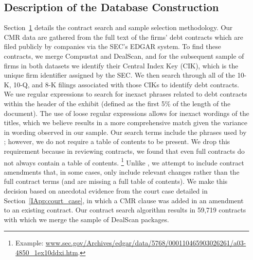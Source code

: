 \documentclass[12pt]{article}
\begin{document}
\begin{appendices}
%
%
\clearpage
\setcounter{page}{1}
\doublespacing

\section{Description of the Database Construction}
\label{IApp:mainvar}

Section~\ref{IApp:mainvar} details the contract search and sample selection methodology.
Our CMR data are gathered from the full text of the firms' debt contracts which are filed publicly by companies via the SEC's EDGAR system.
To find these contracts, we merge Compustat and DealScan, and for the subsequent sample of firms in both datasets we identify their Central Index Key (CIK), which is the unique firm identifier assigned by the SEC.
We then search through all of the 10-K, 10-Q, and 8-K filings associated with those CIKs to identify debt contracts.
We use regular expressions to search for inexact phrases related to debt contracts within the header of the exhibit (defined as the first 5\% of the length of the document).
The use of loose regular expressions allows for inexact wordings of the titles, which we believe results in a more comprehensive match given the variance in wording observed in our sample.
Our search terms include the phrases used by \cite{Nini_2009}; however, we do not require a table of contents to be present. We drop this requirement because in reviewing contracts, we found that even full contracts do not always contain a table of contents.%
    \footnote{Example: \href{http://www.sec.gov/Archives/edgar/data/5768/000110465903026261/a03-4850\_1ex10ddxi.htm}{www.sec.gov/Archives/edgar/data/5768/000110465903026261/a03-4850\_1ex10ddxi.htm}.}
Unlike \cite{Nini_2009}, we attempt to include contract amendments that, in some cases, only include relevant changes rather than the full contract terms (and are missing a full table of contents).
We make this decision based on anecdotal evidence from the court case detailed in Section~\ref{IApp:court_case}, in which a CMR clause was added in an amendment to an existing contract.
Our contract search algorithm results in 59,719 contracts with which we merge the sample of DealScan packages.



\end{appendices}
\end{document}
